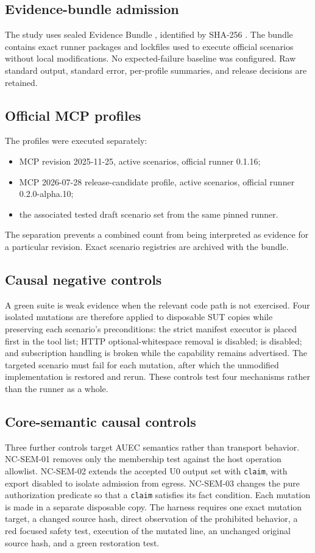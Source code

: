 \subsection{Evidence-bundle admission}
The study uses sealed Evidence Bundle \evidenceid{}, identified by SHA-256 \evidencehash. The bundle contains exact runner packages and lockfiles used to execute official scenarios without local modifications. No expected-failure baseline was configured. Raw standard output, standard error, per-profile summaries, and release decisions are retained.

\subsection{Official MCP profiles}
The profiles were executed separately:
\begin{itemize}
  \item MCP revision 2025-11-25, active scenarios, official runner 0.1.16;
  \item MCP 2026-07-28 release-candidate profile, active scenarios, official runner 0.2.0-alpha.10;
  \item the associated tested draft scenario set from the same pinned runner.
\end{itemize}
The separation prevents a combined count from being interpreted as evidence for a particular revision. Exact scenario registries are archived with the bundle.

\subsection{Causal negative controls}
A green suite is weak evidence when the relevant code path is not exercised. Four isolated mutations are therefore applied to disposable SUT copies while preserving each scenario's preconditions: the strict manifest executor is placed first in the tool list; HTTP optional-whitespace removal is disabled;  is disabled; and subscription handling is broken while the capability remains advertised. The targeted scenario must fail for each mutation, after which the unmodified implementation is restored and rerun. These controls test four mechanisms rather than the runner as a whole.

\subsection{Core-semantic causal controls}
Three further controls target AUEC semantics rather than transport behavior. NC-SEM-01 removes only the membership test against the host operation allowlist. NC-SEM-02 extends the accepted U0 output set with \texttt{claim}, with export disabled to isolate admission from egress. NC-SEM-03 changes the pure authorization predicate so that a \texttt{claim} satisfies its fact condition. Each mutation is made in a separate disposable copy. The harness requires one exact mutation target, a changed source hash, direct observation of the prohibited behavior, a red focused safety test, execution of the mutated line, an unchanged original source hash, and a green restoration test.

